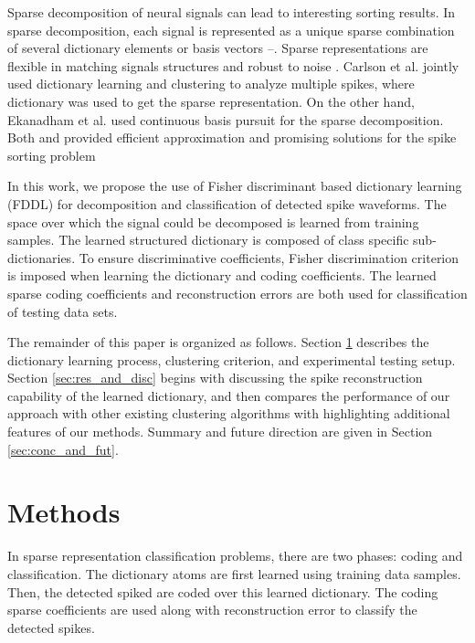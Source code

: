 \documentclass[conference]{IEEEtran}
\begin{document}
	Sparse decomposition of neural signals can lead to interesting sorting results. In sparse decomposition, each signal is represented as a unique sparse combination of several dictionary elements or basis vectors \cite{carlson2013multichannel}–\cite{lewicki2000learning}. Sparse representations are flexible in matching signals structures and robust to noise \cite{lewicki2000learning}. Carlson et al. \cite{carlson2013multichannel} jointly used dictionary learning and clustering to analyze multiple spikes, where dictionary was used to get the sparse representation. On the other hand, Ekanadham et al. \cite{ekanadham2014unified} used continuous basis pursuit for the sparse decomposition. Both \cite{carlson2013multichannel} and \cite{ekanadham2014unified} provided efficient approximation and promising solutions for the spike sorting problem
	
	In this work, we propose the use of Fisher discriminant based dictionary learning (FDDL) \cite{yang2011fisher} for decomposition and classification of detected spike waveforms. The space over which the signal could be decomposed is learned from training samples. The learned structured dictionary is composed of class specific sub-dictionaries. To ensure discriminative coefficients, Fisher discrimination criterion is imposed when learning the dictionary and coding coefficients. The learned sparse coding coefficients and reconstruction errors are both used for classification of testing data sets.
	
	The remainder of this paper is organized as follows. Section \ref{sec:methods} describes the dictionary learning process, clustering criterion, and experimental testing setup. Section \ref{sec:res_and_disc} begins with discussing the spike reconstruction capability of the learned dictionary, and then compares the performance of our approach with other existing clustering algorithms with highlighting additional features of our methods. Summary and future direction are given in Section \ref{sec:conc_and_fut}.
	
	\section{Methods} \label{sec:methods}
	In sparse representation classification problems, there are two phases: coding and classification. The dictionary atoms are first learned using training data samples. Then, the detected spiked are coded over this learned dictionary. The coding sparse coefficients are used along with reconstruction error to classify the detected spikes.
	
\end{document}
